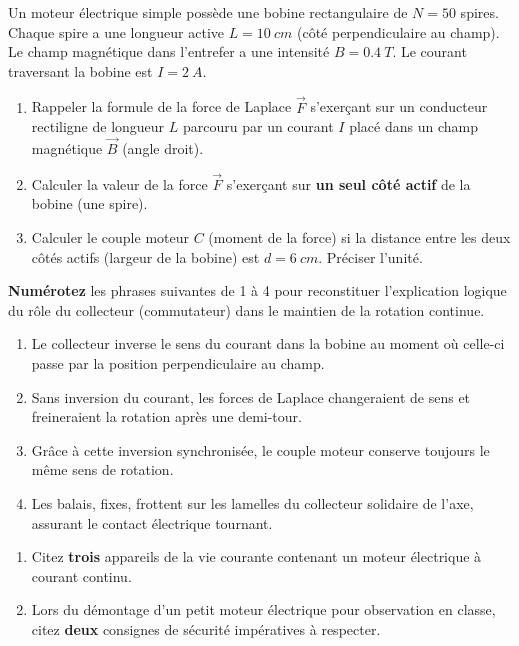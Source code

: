 \documentclass[11pt]{article}
\begin{document}
\begin{exercice}
Un moteur électrique simple possède une bobine rectangulaire de $N = 50$ spires. Chaque spire a une longueur active $L = \SI{10}{cm}$ (côté perpendiculaire au champ). Le champ magnétique dans l'entrefer a une intensité $B = \SI{0,4}{T}$. Le courant traversant la bobine est $I = \SI{2}{A}$.
\begin{enumerate}
    \item Rappeler la formule de la force de Laplace $\vec{F}$ s'exerçant sur un conducteur rectiligne de longueur $L$ parcouru par un courant $I$ placé dans un champ magnétique $\vec{B}$ (angle droit).
    \item Calculer la valeur de la force $\vec{F}$ s'exerçant sur \textbf{un seul côté actif} de la bobine (une spire).
    \item Calculer le couple moteur $C$ (moment de la force) si la distance entre les deux côtés actifs (largeur de la bobine) est $d = \SI{6}{cm}$. Préciser l'unité.
\end{enumerate}
\end{exercice}

\begin{exercice}
\textbf{Numérotez} les phrases suivantes de 1 à 4 pour reconstituer l'explication logique du rôle du collecteur (commutateur) dans le maintien de la rotation continue.
\begin{enumerate}
    \item Le collecteur inverse le sens du courant dans la bobine au moment où celle-ci passe par la position perpendiculaire au champ.
    \item Sans inversion du courant, les forces de Laplace changeraient de sens et freineraient la rotation après une demi-tour.
    \item Grâce à cette inversion synchronisée, le couple moteur conserve toujours le même sens de rotation.
    \item Les balais, fixes, frottent sur les lamelles du collecteur solidaire de l'axe, assurant le contact électrique tournant.
\end{enumerate}
\end{exercice}

\begin{exercice}
\begin{enumerate}
    \item Citez \textbf{trois} appareils de la vie courante contenant un moteur électrique à courant continu.
    \item Lors du démontage d'un petit moteur électrique pour observation en classe, citez \textbf{deux} consignes de sécurité impératives à respecter.
\end{enumerate}
\end{exercice}
\end{document}
